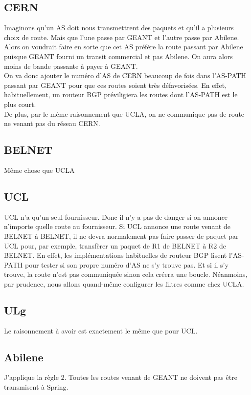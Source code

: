 \documentclass[a4paper, 12pt]{article}
\begin{document}
\subsection{CERN}
Imaginons qu'un AS doit nous transmettrent des paquets et qu'il a plusieurs choix de route.
Mais que l'une passe par GEANT et l'autre passe par Abilene.
Alors on voudrait faire en sorte que cet AS préfère la route passant par Abilene puisque GEANT fourni un transit commercial et pas Abilene.
On aura alors moins de bande passante à payer à GEANT.
\\

On va donc ajouter le numéro d'AS de CERN beaucoup de fois dans l'AS-PATH passant par GEANT pour que ces routes soient très défavorisées.
En effet, habituellement, un routeur BGP préviligiera les routes dont l'AS-PATH est le plus court. 
\\

De plus, par le même raisonnement que UCLA, on ne communique pas de route ne venant pas du réseau CERN.

\subsection{BELNET}
Même chose que UCLA

\subsection{UCL}
UCL n'a qu'un seul fournisseur. Donc il n'y a pas de danger si on annonce n'importe quelle route au fournisseur.
Si UCL annonce une route venant de BELNET à BELNET, il ne devra normalement pas faire passer de paquet par UCL pour, par exemple, transfèrer un paquet de R1 de BELNET à R2 de BELNET.
En effet, les implémentations habituelles de routeur BGP lisent l'AS-PATH pour tester si son propre numéro d'AS ne s'y trouve pas.
Et si il s'y trouve, la route n'est pas communiquée sinon cela créera une boucle.
Néanmoins, par prudence, nous allons quand-même configurer les filtres comme chez UCLA.

\subsection{ULg}
Le raisonnement à avoir est exactement le même que pour UCL.

\subsection{Abilene}
J'applique la règle 2. Toutes les routes venant de GEANT ne doivent pas être transmisent à Spring.
\end{document}
